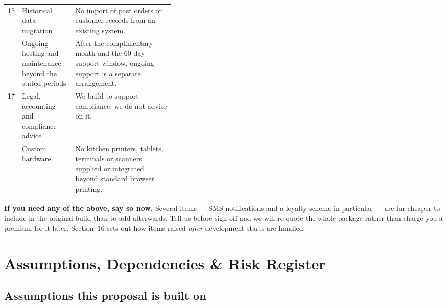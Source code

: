 \documentclass[11pt,a4paper]{article}
\begin{document}
\begin{tabularx}{\linewidth}{@{}C{0.06\linewidth}L{0.32\linewidth}Y@{}}
15 & Historical data migration & No import of past orders or customer records from an
existing system. \\
 & Ongoing hosting and maintenance beyond the stated periods & After the
complimentary month and the 60-day support window, ongoing support is a separate
arrangement. \\
17 & Legal, accounting and compliance advice & We build to support compliance; we do
not advise on it. \\
 & Custom hardware & No kitchen printers, tablets, terminals or scanners
supplied or integrated beyond standard browser printing. \\
\bottomrule
\end{tabularx}

\vspace{8pt}
\begin{keybox}
\textbf{If you need any of the above, say so now.} Several items --- SMS notifications
and a loyalty scheme in particular --- are far cheaper to include in the original build
than to add afterwards. Tell us before sign-off and we will re-quote the whole package
rather than charge you a premium for it later. Section~16 sets out how items raised
\emph{after} development starts are handled.
\end{keybox}

\clearpage
\section{Assumptions, Dependencies \& Risk Register}

\subsection{Assumptions this proposal is built on}
\end{document}
